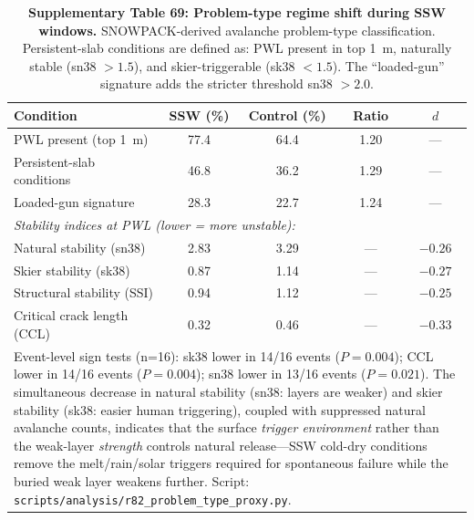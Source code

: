 \documentclass[11pt,letterpaper]{article}
\begin{document}
\begin{table}[!ht]
\centering
\caption{\textbf{Supplementary Table 69: Problem-type regime shift during SSW windows.}
SNOWPACK-derived avalanche problem-type classification. Persistent-slab conditions are defined as: PWL present in top 1~m, naturally stable (sn38 $> 1.5$), and skier-triggerable (sk38 $< 1.5$). The ``loaded-gun'' signature adds the stricter threshold sn38 $> 2.0$.}
\label{tab:problem_type_regime}
\small
\begin{tabular}{lcccc}
\toprule
Condition & SSW (\%) & Control (\%) & Ratio & $d$ \\
\midrule
PWL present (top 1~m) & 77.4 & 64.4 & 1.20 & --- \\
Persistent-slab conditions & 46.8 & 36.2 & 1.29 & --- \\
Loaded-gun signature & 28.3 & 22.7 & 1.24 & --- \\
\midrule
\multicolumn{5}{l}{\textit{Stability indices at PWL (lower = more unstable):}} \\
Natural stability (sn38) & 2.83 & 3.29 & --- & $-0.26$ \\
Skier stability (sk38) & 0.87 & 1.14 & --- & $-0.27$ \\
Structural stability (SSI) & 0.94 & 1.12 & --- & $-0.25$ \\
Critical crack length (CCL) & 0.32 & 0.46 & --- & $-0.33$ \\
\bottomrule
\multicolumn{5}{p{12cm}}{\footnotesize Event-level sign tests (n=16): sk38 lower in 14/16 events ($P = 0.004$); CCL lower in 14/16 events ($P = 0.004$); sn38 lower in 13/16 events ($P = 0.021$). The simultaneous decrease in natural stability (sn38: layers are weaker) and skier stability (sk38: easier human triggering), coupled with suppressed natural avalanche counts, indicates that the surface \emph{trigger environment} rather than the weak-layer \emph{strength} controls natural release---SSW cold-dry conditions remove the melt/rain/solar triggers required for spontaneous failure while the buried weak layer weakens further. Script: \texttt{scripts/analysis/r82\_problem\_type\_proxy.py}.} \\
\end{tabular}
\end{table}
\end{document}
